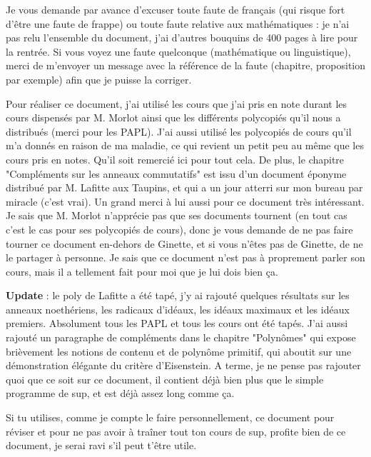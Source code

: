\documentclass[french]{book}
\theoremstyle{plain}
\theoremstyle{definition}
\theoremstyle{remark}
\begin{document}
\par Je vous demande par avance d'excuser toute faute de français (qui risque fort d'être une faute de frappe) ou toute faute relative aux mathématiques : je n'ai pas relu l'ensemble du document, j'ai d'autres bouquins de 400 pages à lire pour la rentrée. Si vous voyez une faute quelconque (mathématique ou linguistique), merci de m'envoyer un message avec la référence de la faute (chapitre, proposition par exemple) afin que je puisse la corriger. \\
\par Pour réaliser ce document, j'ai utilisé les cours que j'ai pris en note durant les cours dispensés par M. Morlot ainsi que les différents polycopiés qu'il nous a distribués (merci pour les PAPL). J'ai aussi utilisé les polycopiés de cours qu'il m'a donnés en raison de ma maladie, ce qui revient un petit peu au même que les cours pris en notes. Qu'il soit remercié ici pour tout cela. De plus, le chapitre "Compléments sur les anneaux commutatifs" est issu d'un document éponyme distribué par M. Lafitte aux Taupins, et qui a un jour atterri sur mon bureau par miracle (c'est vrai). Un grand merci à lui aussi pour ce document très intéressant. Je sais que M. Morlot n'apprécie pas que ses documents tournent (en tout cas c'est le cas pour ses polycopiés de cours), donc je vous demande de ne pas faire tourner ce document en-dehors de Ginette, et si vous n'êtes pas de Ginette, de ne le partager à personne. Je sais que ce document n'est pas à proprement parler son cours, mais il a tellement fait pour moi que je lui dois bien ça. \\
\par \textbf{Update} : le poly de Lafitte a été tapé, j'y ai rajouté quelques résultats sur les anneaux noethériens, les radicaux d'idéaux, les idéaux maximaux et les idéaux premiers. Absolument tous les PAPL et tous les cours ont été tapés. J'ai aussi rajouté un paragraphe de compléments dans le chapitre "Polynômes" qui expose brièvement les notions de contenu et de polynôme primitif, qui aboutit sur une démonstration élégante du critère d'Eisenstein. A terme, je ne pense pas rajouter quoi que ce soit sur ce document, il contient déjà bien plus que le simple programme de sup, et est déjà assez long comme ça. \\
\par Si tu utilises, comme je compte le faire personnellement, ce document pour réviser et pour ne pas avoir à traîner tout ton cours de sup, profite bien de ce document, je serai ravi s'il peut t'être utile. \\
\end{document}
